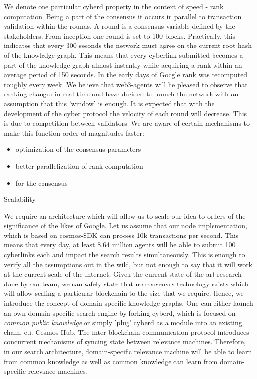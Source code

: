 \documentclass[8pt,oneside]{amsart}
\makeatletter
\newcommand{\linkred}[2]{\href{#1}{\color{red}{#2}}}
\renewcommand\subsection{\@startsection{subsection}
                                    {2}{\z@}
                                    {-3.25ex\@plus -1ex \@minus -.2ex}
                                    {0ex \@plus .2ex}
                                    {\play\Large}
                        }
\newcommand{\titleSection}[1]{\subsection{#1}}
\newcommand{\code}[1]{{\PlayBold #1}}
\makeatother
\begin{document}
We denote one particular cyberd property in the context of speed - rank computation. Being a part of the consensus it occurs in parallel to transaction validation within the rounds. A round is a consensus variable defined by the stakeholders. From inception one round is set to 100 blocks. Practically, this indicates that every 300 seconds the network must agree on the current root hash of the knowledge graph. This means that every cyberlink submitted becomes a part of the knowledge graph almost instantly while acquiring a rank within an average period of 150 seconds. In the early days of Google rank was recomputed roughly every week. We believe that web3-agents will be pleased to observe that ranking changes in real-time and have decided to launch the network with an assumption that this 'window' is enough. It is expected that with the development of the cyber protocol the velocity of each round will decrease. This is due to competition between validators. We are aware of certain mechanisms to make this function order of magnitudes faster:

\begin{itemize}
\item optimization of the consensus parameters
\item better parallelization of rank computation
\item \linkred{https://medium.com/solana-labs/proof-of-history-a-clock-for-blockchain-cf47a61a9274}{a better clock} for the consensus
\end{itemize}

\titleSection{Scalability}\label{Scalability}

We require an architecture which will allow us to scale our idea to orders of the significance of the likes of Google. Let us assume that our node implementation, which is based on \code{cosmos-SDK} can process 10k transactions per second. This means that every day, at least 8.64 million agents will be able to submit 100 cyberlinks each and impact the search results simultaneously. This is enough to verify all the assumptions out in the wild, but not enough to say that it will work at the current scale of the Internet. Given the current state of the art research done by our team, we can safely state that no consensus technology exists which will allow scaling a particular blockchain to the size that we require. Hence, we introduce the concept of domain-specific knowledge graphs. One can either launch an own domain-specific search engine by forking cyberd, which is focused on \textit{common public knowledge} or simply 'plug' cyberd as a module into an existing chain, e.i. Cosmos Hub. The inter-blockchain communication protocol introduces concurrent mechanisms of syncing state between relevance machines. Therefore, in our search architecture, domain-specific relevance machine will be able to learn from common knowledge as well as common knowledge can learn from domain-specific relevance machines.
\end{document}
